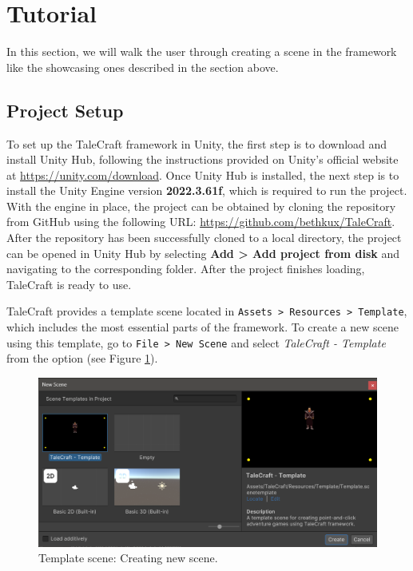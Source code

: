\section{Tutorial}
In this section, we will walk the user through creating a scene in the framework like the showcasing ones described in the section above. 

\subsection{Project Setup}
To set up the TaleCraft framework in Unity, the first step is to download and install Unity Hub, following the instructions provided on Unity’s official website at \href{https://unity.com/download}{https://unity.com/download}. Once Unity Hub is installed, the next step is to install the Unity Engine version \textbf{2022.3.61f}, which is required to run the project. With the engine in place, the project can be obtained by cloning the repository from GitHub using the following URL: \href{https://github.com/bethkux/TaleCraft}{https://github.com/bethkux/TaleCraft}. After the repository has been successfully cloned to a local directory, the project can be opened in Unity Hub by selecting \textbf{Add > Add project from disk} and navigating to the corresponding folder. After the project finishes loading, TaleCraft is ready to use.


TaleCraft provides a template scene located in \verb|Assets > Resources > Template|, which includes the most essential parts of the framework. To create a new scene using this template, go to \texttt{File > New Scene} and select \textit{TaleCraft - Template} from the option (see Figure \ref{fig:Tutorial-template:new}). 

\begin{figure}[H]
\centering
\includegraphics[width=.9\linewidth]{img/User doc/image_2025-07-09_161736255.png}
\caption{Template scene: Creating new scene.}
\label{fig:Tutorial-template:new}
\end{figure}

